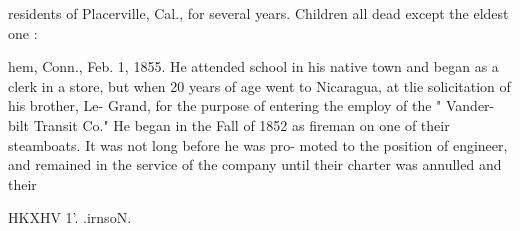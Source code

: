 \documentclass{book}
\begin{document}
residents of Placerville, Cal., for several years. Children all 
dead except the eldest one : 







hem, Conn., Feb. 1, 1855. He attended school in his native 
town and began as a clerk in a store, but when 20 years of 
age went to Nicaragua, at tlie solicitation of his brother, Le- 
Grand, for the purpose of entering the employ of the " Vander- 
bilt Transit Co." He began in the Fall of 1852 as fireman on 
one of their steamboats. It was not long before he was pro- 
moted to the position of engineer, and remained in the service 
of the company until their charter was annulled and their 




HKXHV 1'. .irnsoN. 
\end{document}
